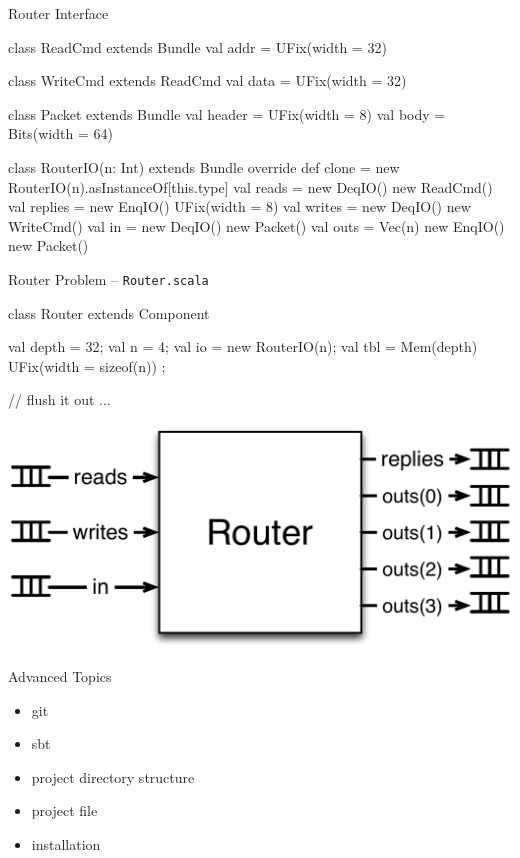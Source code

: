 \documentclass[xcolor=pdflatex,dvipsnames,table]{beamer}
\begin{document}
\begin{frame}[fragile]{Router Interface}

{
\begin{scala}
class ReadCmd extends Bundle {
  val addr = UFix(width = 32)
}

class WriteCmd extends ReadCmd {
  val data = UFix(width = 32)
}

class Packet extends Bundle {
  val header = UFix(width = 8)
  val body   = Bits(width = 64)
}

class RouterIO(n: Int) extends Bundle {
  override def clone = new RouterIO(n).asInstanceOf[this.type]
  val reads   = new DeqIO(){ new ReadCmd() }
  val replies = new EnqIO(){ UFix(width = 8) }
  val writes  = new DeqIO(){ new WriteCmd() }
  val in      = new DeqIO(){ new Packet() }
  val outs    = Vec(n){ new EnqIO(){ new Packet() } }
}
\end{scala}
}

\end{frame}

\begin{frame}[fragile]{Router Problem -- \tt Router.scala}
\begin{scala}
class Router extends Component {
  val depth = 32;
  val n     = 4;
  val io    = new RouterIO(n);
  val tbl   = Mem(depth){ UFix(width = sizeof(n)) };
  
  // flush it out ...
}
\end{scala}
\begin{center}
\includegraphics[height=0.45\textheight]{figs/trouter.pdf} 
\end{center}
\end{frame}

\begin{frame}[fragile]{Advanced Topics}

\begin{itemize}
\item git
\item sbt
\item project directory structure
\item project file
\item installation
\end{itemize}

\end{frame}
\end{document}
